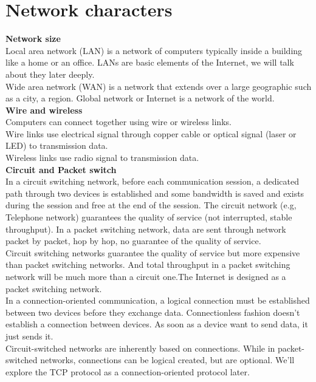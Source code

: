 \documentclass[a4paper, 11pt]{article}
\begin{document}
\clearpage
\section{Network characters}

\textbf{Network size}\\
Local area network (LAN) is a network of computers typically inside a building like a home or an office. LANs are basic elements of the Internet, we will talk about they later deeply.\\

Wide area network (WAN) is a network that extends over a large geographic such as a city, a region. Global network or Internet is a network of the world.\\

\noindent \textbf{Wire and wireless}\\
Computers can connect together using wire or wireless links.\\
Wire links use electrical signal through copper cable or optical signal (laser or LED) to transmission data.\\
Wireless links use radio signal to transmission data.\\

\noindent \textbf{Circuit and Packet switch}\\
In a circuit switching network, before each communication session, a dedicated path through two devices is established and some bandwidth is saved and exists during the session and free at the end of the session. The circuit network (e.g, Telephone network) guarantees the quality of service (not interrupted, stable throughput). In a packet switching network, data are sent through network packet by packet, hop by hop, no guarantee of the quality of service.\\

Circuit switching networks guarantee the quality of service but more expensive than packet switching networks. And total throughput in a packet switching network will be much more than a circuit one.The Internet is designed as a packet switching network.\\

In a connection-oriented communication, a logical connection must be established between two devices before they exchange data. Connectionless fashion doesn't establish a connection between devices. As soon as a device want to send data, it just sends it.\\

Circuit-switched networks are inherently based on connections. While in packet-switched networks, connections can be logical created, but are optional. We'll explore the TCP protocol as a connection-oriented protocol later.\\
\end{document}
